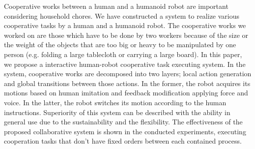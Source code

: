Cooperative works between a human and a humanoid robot are important considering household chores. We have constructed a system to realize various cooperative tasks by a human and a humanoid robot. The cooperative works we worked on are those which have to be done by two workers because of the size or the weight of the objects that are too big or heavy to be manipulated by one person (e.g. folding a large tablecloth or carrying a large board). In this paper, we propose a interactive human-robot cooperative task executing system. In the system, cooperative works are decomposed into two layers; local action generation and global transitions between those actions. In the former, the robot acquires its motions based on human imitation and feedback modification applying force and voice. In the latter, the robot switches its motion according to the human instructions. Superiority of this system can be described with the ability in general use due to the sustainability and the flexibility. The effectiveness of the proposed collaborative system is shown in the conducted experiments, executing cooperation tasks that don't have fixed orders between each contained process.


